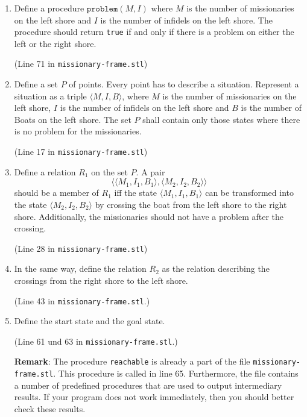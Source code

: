 \documentclass{article}
\begin{document}
\begin{enumerate}
\item Define a procedure $\texttt{problem}(M, I)$ where $M$ is the number of missionaries
      on the left shore and $I$ is the number of infidels on the left shore.
      The procedure should return \texttt{true} if and only if there is a problem
      on either the left or the right shore.

      (Line 71 in \texttt{missionary-frame.stl})
\item Define a set $P$ of points.  Every point has to describe a situation.  Represent a
      situation as a triple $\langle M, I, B \rangle$,
      where  $M$ is the number of missionaries on the left shore, $I$ is the number of
      infidels on the left shore and $B$ is the number of Boats on the left shore.
      The set $P$ shall contain only those states where there is no problem for the
      missionaries.

      (Line 17 in \texttt{missionary-frame.stl})
\item Define a relation $R_{1}$ on the set $P$.
      A pair
      \[ \bigl\langle \langle M_1, I_1, B_1 \rangle, \langle M_2, I_2, B_2 \rangle \bigr\rangle \]
      should be a member of
      $R_{1}$ iff the state $\langle M_1, I_1, B_1\rangle$ can be transformed into the state
      $\langle M_2, I_2, B_2\rangle$
      by crossing the boat from the left shore to the right shore.
      Additionally, the missionaries should not have a problem after the crossing.

      (Line 28 in \texttt{missionary-frame.stl})
\item In the same way, define the relation $R_{2}$ as the relation describing the
      crossings from the right shore to the left shore.    

  
      (Line 43 in \texttt{missionary-frame.stl}.)
\item Define the start state and the goal state.

      (Line 61 und 63 in \texttt{missionary-frame.stl}.)

      \textbf{Remark}:  The procedure  \texttt{reachable} is already a part of the file
       \texttt{missionary-frame.stl}.  This procedure is called in line 65.  Furthermore,
       the file contains a number of predefined procedures that are used to output
       intermediary results.  If your program does not work immediately, then you
       should better check these results.
\end{enumerate}
\end{document}
